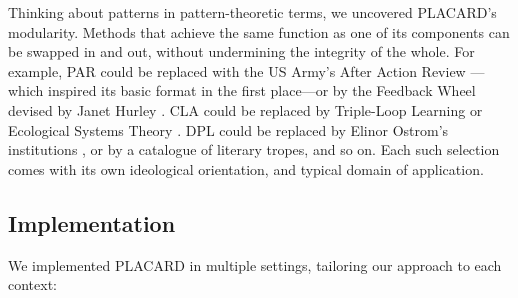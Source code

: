 \documentclass[acmlarge,timestamp]{acmart}
\begin{document}
\medskip

Thinking about patterns in pattern-theoretic terms, we uncovered
PLACARD’s modularity.  Methods that achieve the same function as one
of its components can be swapped in and out, without undermining the
integrity of the whole.  For example, PAR could be replaced with the
US Army's After Action Review \cite{afteraction}---which inspired its
basic format in the first place---or by the Feedback Wheel devised by Janet Hurley
\cite{real2008new}. CLA could be replaced by Triple-Loop Learning
\cite{tosey2012origins} or Ecological Systems Theory
\cite{bronfenbrenner-est}.  DPL could be replaced by Elinor Ostrom's
institutions \cite{Ostrom_1990}, or by a catalogue of literary tropes,
and so on.  Each such selection comes with its own ideological
orientation, and typical domain of application.

\subsection{Implementation}

{We implemented PLACARD in multiple settings, tailoring our
  approach to each context:}
\medskip
\end{document}

